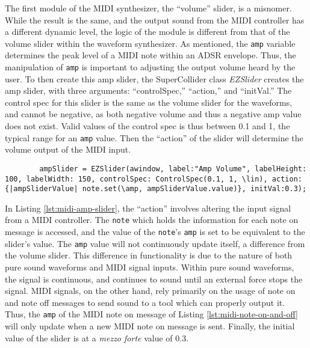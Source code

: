 The first module of the MIDI synthesizer, the ``volume'' slider, is a misnomer. While the result is the same, and the output sound from the MIDI controller has a different dynamic level, the logic of the module is different from that of the volume slider within the waveform synthesizer. As mentioned, the \texttt{amp} variable determines the peak level of a MIDI note within an ADSR envelope. Thus, the manipulation of \texttt{amp} is important to adjusting the output volume heard by the user. To then create this amp slider, the SuperCollider class \textit{EZSlider} creates the amp slider, with three arguments: ``controlSpec,'' ``action,'' and ``initVal.'' The control spec for this slider is the same as the volume slider for the waveforms, and cannot be negative, as both negative volume and thus a negative amp value does not exist. Valid values of the control spec is thus between 0.1 and 1, the typical range for an \texttt{amp} value. Then the ``action'' of the slider will determine the volume output of the MIDI input. 

\begin{listing}
	\begin{lstlisting}
		ampSlider = EZSlider(awindow, label:"Amp Volume", labelHeight: 100, labelWidth: 150, controlSpec: ControlSpec(0.1, 1, \lin), action:{|ampSliderValue| note.set(\amp, ampSliderValue.value)}, initVal:0.3);
	\end{lstlisting}	
	\caption{Creating the amp slider for MIDI}
	\label{lst:midi-amp-slider}
\end{listing}

In Listing \ref{lst:midi-amp-slider}, the ``action'' involves altering the input signal from a MIDI controller. The \texttt{note} which holds the information for each note on message is accessed, and the value of the \texttt{note}'s \texttt{amp} is set to be equivalent to the slider's value. The \texttt{amp} value will not continuously update itself, a difference from the volume slider. This difference in functionality is due to the nature of both pure sound waveforms and MIDI signal inputs. Within pure sound waveforms, the signal is continuous, and continues to sound until an external force stops the signal. MIDI signals, on the other hand, rely primarily on the usage of note on and note off messages to send sound to a tool which can properly output it. Thus, the \texttt{amp} of the MIDI note on message of Listing \ref{lst:midi-note-on-and-off} will only update when a new MIDI note on message is sent. Finally, the initial value of the slider is at a \textit{mezzo forte} value of 0.3.

